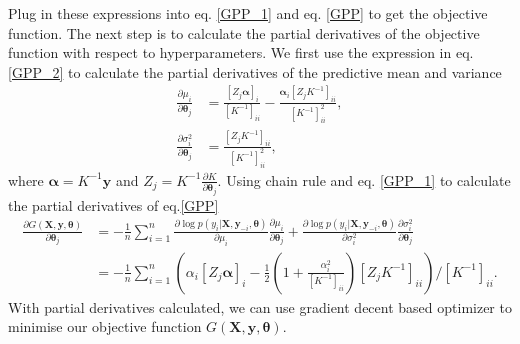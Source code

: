 \documentclass[11pt,a4paper]{article}
\theoremstyle{definition}
\numberwithin{equation}{section}
\let\vec\mathbf
\begin{document}
Plug in these expressions into eq. \ref{GPP_1} and eq. \ref{GPP} to get the objective function. The next step is to calculate the partial derivatives of the objective function with respect to hyperparameters. We first use the expression in eq. \ref{GPP_2} to calculate the partial derivatives of the predictive mean and variance
\begin{equation}\label{GPP_3}
\begin{split}
\frac{\partial\mu_i}{\partial \vec \theta_j} &= \frac{[Z_j \vec \alpha]_i}{[K^{-1}]_{ii}} - \frac{\vec \alpha_i[Z_j K^{-1}]_{ii}}{[K^{-1}]^2_{ii}},\\
\frac{\partial\sigma^2_i}{\partial \vec \theta_j} &= \frac{[Z_j K^{-1}]_{ii}}{[K^{-1}]^2_{ii}},
\end{split}
\end{equation}
where $\vec \alpha = K^{-1}\vec y$ and $Z_j = K^{-1}\frac{\partial K}{\partial \vec \theta_j}$. Using chain rule and eq. \ref{GPP_1} to calculate the partial derivatives of eq.\ref{GPP}
\begin{equation}\label{GPP_derivative}
\begin{split}
\frac{\partial G(\vec X,\vec y, \vec \theta)}{\partial \vec \theta_j} &= -\frac{1}{n}\sum_{i=1}^{n}\frac{\partial \log p(y_i|\vec X,\vec y_{-i},\vec \theta)}{\partial \mu_i}\frac{\partial \mu_i}{\partial \vec \theta_j} + \frac{\partial \log p(y_i|\vec X,\vec y_{-i},\vec \theta)}{\partial \sigma^2_i}\frac{\partial \sigma^2_i}{\partial \vec \theta_j}\\
&=-\frac{1}{n}\sum_{i=1}^{n}\left(\alpha_i[Z_j \vec{\alpha}]_i - \frac{1}{2}\left(1+\frac{\alpha^2_i}{[K^{-1}]_{ii}}\right)[Z_j K^{-1}]_{ii}\right)/[K^{-1}]_{ii}.
\end{split}
\end{equation}
With partial derivatives calculated, we can use gradient decent based optimizer to minimise our objective function $G(\vec X,\vec y, \vec \theta)$.
\end{document}

